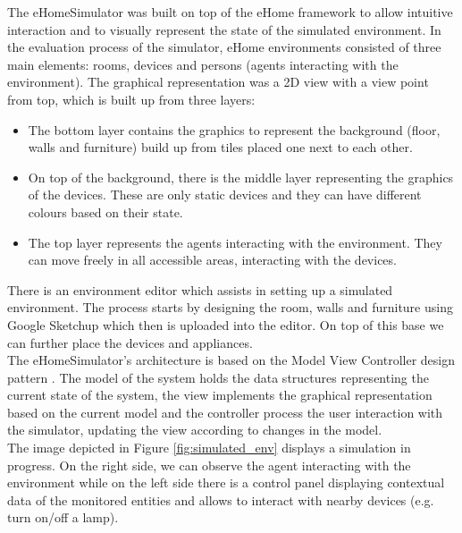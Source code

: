 The eHomeSimulator was built on top of the eHome framework to allow intuitive interaction and to visually represent the state of the simulated environment. In the evaluation process of the simulator, eHome environments consisted of three main elements: rooms, devices and persons (agents interacting with the environment). The graphical representation was a 2D view with a view point from top, which is built up from three layers:
\begin{itemize}
	\item The bottom layer contains the graphics to represent the background (floor, walls and furniture) build up from tiles placed one next to each other.
	\item On top of the background, there is the middle layer representing the graphics of the devices. These are only static devices and they can have different colours based on their state.
	\item The top layer represents the agents interacting with the environment. They can move freely in all accessible areas, interacting with the devices.
\end{itemize}

There is an environment editor which assists in setting up a simulated environment. The process starts by designing the room, walls and furniture using Google Sketchup \cite{sketchup:online} which then is uploaded into the editor. On top of this base we can further place the devices and appliances.\\

The eHomeSimulator's architecture is based on the Model View Controller design pattern \cite{erich1995design}. The model of the system holds the data structures representing the current state of the system, the view implements the graphical representation based on the current model and the controller process the user interaction with the simulator, updating the view according to changes in the model.\\

The image depicted in Figure \ref{fig:simulated_env} displays a simulation in progress. On the right side, we can observe the agent interacting with the environment while on the left side there is a control panel displaying contextual data of the monitored entities and allows to interact with nearby devices (e.g. turn on/off a lamp).

